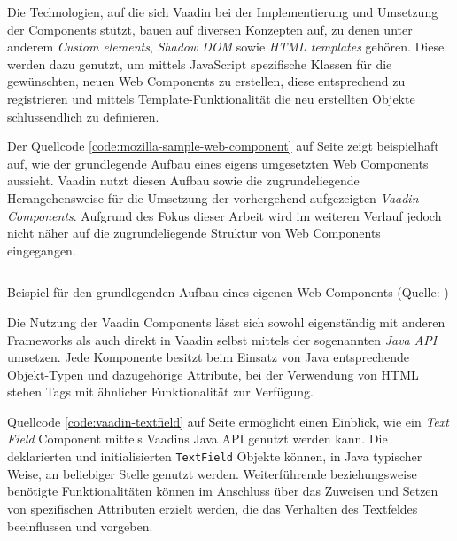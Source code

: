 \documentclass[a4paper,12pt,twoside]{scrreprt}
\begin{document}
Die Technologien, auf die sich Vaadin bei der Implementierung und Umsetzung der Components stützt, bauen auf diversen Konzepten auf, zu denen unter anderem \textit{Custom elements}, \textit{Shadow \ac{DOM}} sowie \textit{HTML templates} gehören. Diese werden dazu genutzt, um mittels JavaScript spezifische Klassen für die gewünschten, neuen Web Components zu erstellen, diese entsprechend zu registrieren und mittels Template-Funktionalität die neu erstellten Objekte schlussendlich zu definieren. \parencite[][]{mozilla_contributors_web_2021}

\medskip

Der Quellcode \ref{code:mozilla-sample-web-component} auf Seite \pageref{code:mozilla-sample-web-component} zeigt beispielhaft auf, wie der grundlegende Aufbau eines eigens umgesetzten Web Components aussieht. Vaadin nutzt diesen Aufbau sowie die zugrundeliegende Herangehensweise für die Umsetzung der vorhergehend aufgezeigten \textit{Vaadin Components}. \parencite[vgl.][]{vaadin_ltd_vaadin-text-fieldjs_2021} Aufgrund des Fokus dieser Arbeit wird im weiteren Verlauf jedoch nicht näher auf die zugrundeliegende Struktur von Web Components eingegangen.

\begin{listing}[ht]
    \inputminted[fontsize=\footnotesize,linenos]{js}{code/web_components_mozilla.js}
    \caption[Beispiel für den grundlegenden Aufbau eines eigenen Web Components]{Beispiel für den grundlegenden Aufbau eines eigenen Web Components (Quelle: \cite[][]{mozilla_contributors_using_2021})}
    \label{code:mozilla-sample-web-component}
\end{listing}

Die Nutzung der Vaadin Components lässt sich sowohl eigenständig mit anderen Frameworks als auch direkt in Vaadin selbst mittels der sogenannten \textit{Java API} umsetzen. Jede Komponente besitzt beim Einsatz von Java entsprechende Objekt-Typen und dazugehörige Attribute, bei der Verwendung von HTML stehen Tags mit ähnlicher Funktionalität zur Verfügung. \parencite[][]{vaadin_ltd_mobile_nodate}

\medskip

Quellcode \ref{code:vaadin-textfield} auf Seite \pageref{code:vaadin-textfield} ermöglicht einen Einblick, wie ein \textit{Text Field} Component mittels Vaadins Java API genutzt werden kann. Die deklarierten und initialisierten \texttt{TextField} Objekte können, in Java typischer Weise, an beliebiger Stelle genutzt werden. Weiterführende beziehungsweise benötigte Funktionalitäten können im Anschluss über das Zuweisen und Setzen von spezifischen Attributen erzielt werden, die das Verhalten des Textfeldes beeinflussen und vorgeben.
\end{document}
